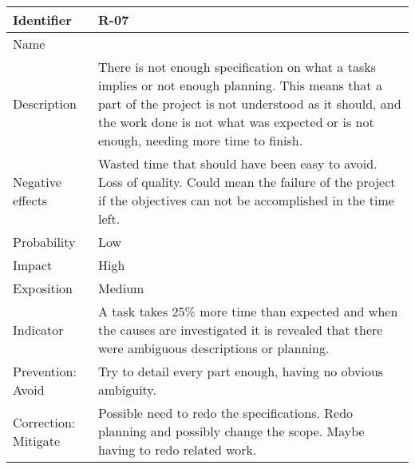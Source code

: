 \begin{table}[H]
	\begin{tabularx}{\textwidth}{|y|z|}
		\hline
		Identifier & \textbf{R-07} \\ \hline
		Name & \Rsiete \\ \hline
		Description &
			There is not enough specification on what a tasks implies or not enough planning. \linej
			This means that a part of the project is not understood as it should, and the work done is not what was expected or is not enough, needing more time to finish.
		\\ \hline
		Negative effects &
			Wasted time that should have been easy to avoid. \linej
			Loss of quality. \linej
			Could mean the failure of the project if the objectives can not be accomplished in the time left.
		\\ \hline
		Probability & Low\\ \hline
		Impact &  High\\ \hline
		Exposition &  Medium\\ \hline
		Indicator & A task takes 25\% more time than expected and when the causes are investigated it is revealed that there were ambiguous descriptions or planning.\\ \hline
		Prevention: Avoid &
			Try to detail every part enough, having no obvious ambiguity.
		\\ \hline
		Correction: Mitigate &
			Possible need to redo the specifications.  \linej
			Redo planning and possibly change the scope.  \linej
			Maybe having to redo related work.
		\\ \hline
	\end{tabularx}
\end{table}

